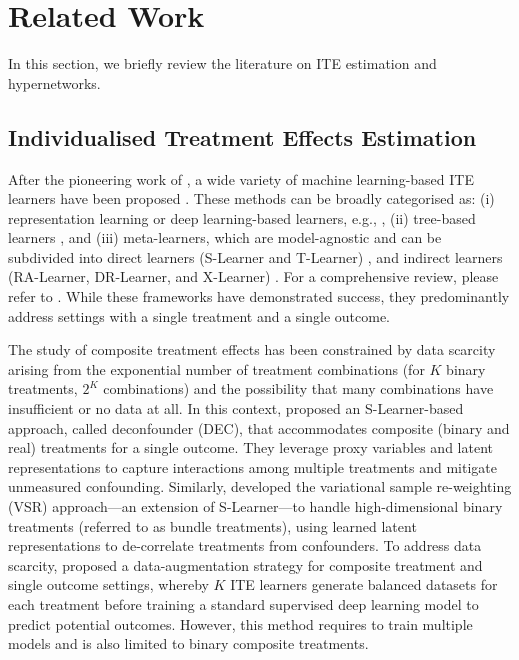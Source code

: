 \section{Related Work}
\label{sec_related_work}
In this section, we briefly review the literature on ITE estimation and hypernetworks.

\subsection{Individualised Treatment Effects Estimation}
\label{subsec_ITE}
After the pioneering work of \cite{johansson2016learning}, a wide variety of machine learning-based ITE learners have been proposed \cite{bica2021real}. These methods can be broadly categorised as: (i) representation learning or deep learning-based learners, e.g., \cite{curth2021inductive,shalit2017estimating,hassanpour2019counterfactual,hassanpour2019learning,chauhan2023adversarial,chauhan2024dynamic}, (ii) tree-based learners \cite{athey2019estimating}, and (iii) meta-learners, which are model-agnostic and can be subdivided into direct learners (S-Learner and T-Learner) \cite{kunzel2019metalearners}, and indirect learners (RA-Learner, DR-Learner, and X-Learner) \cite{kennedy2023towards,curth2021nonparametric,kunzel2019metalearners}. For a comprehensive review, please refer to \cite{Curth2024Machine}. While these frameworks have demonstrated success, they predominantly address settings with a single treatment and a single outcome.

The study of composite treatment effects has been constrained by data scarcity arising from the exponential number of treatment combinations (for $K$ binary treatments, $2^K$ combinations) and the possibility that many combinations have insufficient or no data at all. In this context, \cite{wang2019blessings} proposed an S-Learner-based approach, called deconfounder (DEC), that accommodates composite (binary and real) treatments for a single outcome. They leverage proxy variables and latent representations to capture interactions among multiple treatments and mitigate unmeasured confounding. Similarly, \cite{zou2020counterfactual} developed the variational sample re-weighting (VSR) approach—an extension of S-Learner—to handle high-dimensional binary treatments (referred to as bundle treatments), using learned latent representations to de-correlate treatments from confounders. To address data scarcity, \cite{qian2021estimating} proposed a data-augmentation strategy for composite treatment and single outcome settings, whereby $K$ ITE learners generate balanced datasets for each treatment before training a standard supervised deep learning model to predict potential outcomes. However, this method requires to train multiple models and is also limited to binary composite treatments.

